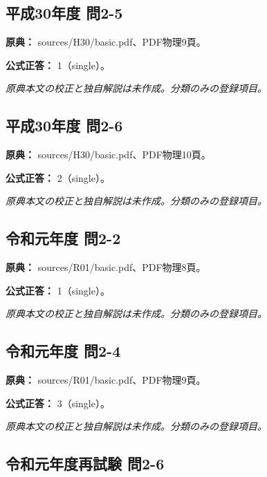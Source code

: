 \subsection{平成30年度 問2-5}
\label{q:h30-reg-basic-2-5}

\noindent\textbf{原典：} sources/H30/basic.pdf、PDF物理9頁。

\textbf{公式正答：} 1（single）。

\par\textit{原典本文の校正と独自解説は未作成。分類のみの登録項目。}

\subsection{平成30年度 問2-6}
\label{q:h30-reg-basic-2-6}

\noindent\textbf{原典：} sources/H30/basic.pdf、PDF物理10頁。

\textbf{公式正答：} 2（single）。

\par\textit{原典本文の校正と独自解説は未作成。分類のみの登録項目。}

\subsection{令和元年度 問2-2}
\label{q:r01-reg-basic-2-2}

\noindent\textbf{原典：} sources/R01/basic.pdf、PDF物理8頁。

\textbf{公式正答：} 1（single）。

\par\textit{原典本文の校正と独自解説は未作成。分類のみの登録項目。}

\subsection{令和元年度 問2-4}
\label{q:r01-reg-basic-2-4}

\noindent\textbf{原典：} sources/R01/basic.pdf、PDF物理9頁。

\textbf{公式正答：} 3（single）。

\par\textit{原典本文の校正と独自解説は未作成。分類のみの登録項目。}

\subsection{令和元年度再試験 問2-6}
\label{q:r01-ret-basic-2-6}

